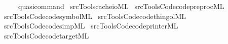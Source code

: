 \begin{isabellebody}
\ \ \ \ {\isacharcolon}{\kern0pt}{\isacharcolon}{\kern0pt}\ quasi{\isacharunderscore}{\kern0pt}command\isanewline
{}%
\endisatagtheory
{\isafoldtheory}%
%
\isadelimtheory
\isanewline
%
\endisadelimtheory
%
\isadelimML
\isanewline
%
\endisadelimML
%
\isatagML
{}\isamarkupfalse%
\ {\isacartoucheopen}{\isachartilde}{\kern0pt}{\isachartilde}{\kern0pt}{\isacharslash}{\kern0pt}src{\isacharslash}{\kern0pt}Tools{\isacharslash}{\kern0pt}cache{\isacharunderscore}{\kern0pt}io{\isachardot}{\kern0pt}ML{\isacartoucheclose}\isanewline
{}\isamarkupfalse%
\ {\isacartoucheopen}{\isachartilde}{\kern0pt}{\isachartilde}{\kern0pt}{\isacharslash}{\kern0pt}src{\isacharslash}{\kern0pt}Tools{\isacharslash}{\kern0pt}Code{\isacharslash}{\kern0pt}code{\isacharunderscore}{\kern0pt}preproc{\isachardot}{\kern0pt}ML{\isacartoucheclose}\isanewline
{}\isamarkupfalse%
\ {\isacartoucheopen}{\isachartilde}{\kern0pt}{\isachartilde}{\kern0pt}{\isacharslash}{\kern0pt}src{\isacharslash}{\kern0pt}Tools{\isacharslash}{\kern0pt}Code{\isacharslash}{\kern0pt}code{\isacharunderscore}{\kern0pt}symbol{\isachardot}{\kern0pt}ML{\isacartoucheclose}\isanewline
{}\isamarkupfalse%
\ {\isacartoucheopen}{\isachartilde}{\kern0pt}{\isachartilde}{\kern0pt}{\isacharslash}{\kern0pt}src{\isacharslash}{\kern0pt}Tools{\isacharslash}{\kern0pt}Code{\isacharslash}{\kern0pt}code{\isacharunderscore}{\kern0pt}thingol{\isachardot}{\kern0pt}ML{\isacartoucheclose}\isanewline
{}\isamarkupfalse%
\ {\isacartoucheopen}{\isachartilde}{\kern0pt}{\isachartilde}{\kern0pt}{\isacharslash}{\kern0pt}src{\isacharslash}{\kern0pt}Tools{\isacharslash}{\kern0pt}Code{\isacharslash}{\kern0pt}code{\isacharunderscore}{\kern0pt}simp{\isachardot}{\kern0pt}ML{\isacartoucheclose}\isanewline
{}\isamarkupfalse%
\ {\isacartoucheopen}{\isachartilde}{\kern0pt}{\isachartilde}{\kern0pt}{\isacharslash}{\kern0pt}src{\isacharslash}{\kern0pt}Tools{\isacharslash}{\kern0pt}Code{\isacharslash}{\kern0pt}code{\isacharunderscore}{\kern0pt}printer{\isachardot}{\kern0pt}ML{\isacartoucheclose}\isanewline
{}\isamarkupfalse%
\ {\isacartoucheopen}{\isachartilde}{\kern0pt}{\isachartilde}{\kern0pt}{\isacharslash}{\kern0pt}src{\isacharslash}{\kern0pt}Tools{\isacharslash}{\kern0pt}Code{\isacharslash}{\kern0pt}code{\isacharunderscore}{\kern0pt}target{\isachardot}{\kern0pt}ML{\isacartoucheclose}\isanewline

\end{isabellebody}
